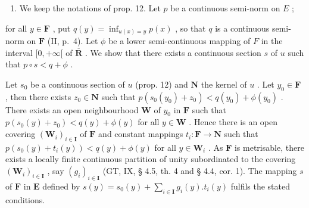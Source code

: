 \begin{enumerate}
\def\labelenumi{\arabic{enumi})}
\setcounter{enumi}{1}
\tightlist
\item
  We keep the notations of prop. 12. Let \(p\) be a continuous semi-norm on \(E\) ;
\end{enumerate}

for all \(y \in \mathbf{F}\) , put \(q(y) = \inf_{u(x) = y} p(x)\) , so that \(q\) is a continuous semi-norm on \(\mathbf{F}\) (II, p.~4). Let \(\phi\) be a lower semi-continuous mapping of \(F\) in the interval \([0, +\infty[\) of \(\overline{\mathbf{R}}\) . We show that there exists a continuous section \(s\) of \(u\) such that \(p \circ s < q + \phi\) .

Let \(s_0\) be a continuous section of \(u\) (prop. 12) and \(\mathbf{N}\) the kernel of \(u\) . Let \(y_0 \in \mathbf{F}\) , then there exists \(z_0 \in \mathbf{N}\) such that \(p(s_0(y_0) + z_0) < q(y_0) + \phi(y_0)\) . There exists an open neighbourhood \(\mathbf{W}\) of \(y_0\) in \(\mathbf{F}\) such that \(p(s_0(y) + z_0) < q(y) + \phi(y)\) for all \(y \in \mathbf{W}\) . Hence there is an open covering \((\mathbf{W}_i)_{i \in \mathbf{I}}\) of \(\mathbf{F}\) and constant mappings \(t_i: \mathbf{F} \to \mathbf{N}\) such that \(p(s_0(y) + t_i(y)) < q(y) + \phi(y)\) for all \(y \in \mathbf{W}_i\) . As \(\mathbf{F}\) is metrisable, there exists a locally finite continuous partition of unity subordinated to the covering \((\mathbf{W}_i)_{i \in \mathbf{I}}\) , say \((g_i)_{i \in \mathbf{I}}\) (GT, IX, § 4.5, th. 4 and § 4.4, cor. 1). The mapping \(s\) of \(\mathbf{F}\) in \(\mathbf{E}\) defined by \(s(y) = s_0(y) + \sum_{i \in \mathbf{I}} g_i(y). t_i(y)\) fulfils the stated conditions.

